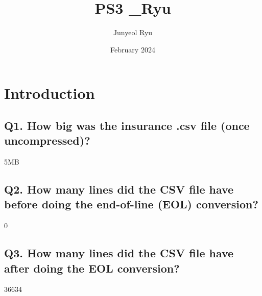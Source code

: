 \documentclass{article}
\title{PS3 \_Ryu}
\author{Junyeol Ryu}
\date{February 2024}
\begin{document}
\maketitle

\section{Introduction}

\subsection{Q1. How big was the insurance .csv file (once uncompressed)?} 
5MB

\subsection{Q2. How many lines did the CSV file have before doing the end-of-line (EOL) conversion?}
0

\subsection{Q3. How many lines did the CSV file have after doing the EOL conversion?} 
36634
\end{document}
